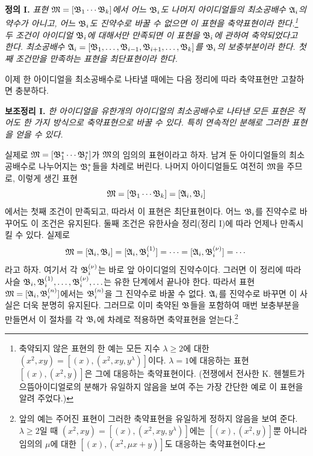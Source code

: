 \textbf{정의 I.} \emph{표현 $\mathfrak{M}=[\mathfrak{B}_1\cdots\mathfrak{B}_k]$에서 어느 $\mathfrak{B}_i$도 나머지 아이디얼들의 최소공배수 $\mathfrak{A}_i$의 약수가 아니고, 어느 $\mathfrak{B}_i$도 진약수로 바꿀 수 없으면 이 표현을 축약표현이라 한다.\footnote{축약되지 않은 표현의 한 예는 모든 지수 $\lambda\ge2$에 대한 $(x^2,xy)=[(x),(x^2,xy,y^\lambda)]$이다. $\lambda=1$에 대응하는 표현 $[(x),(x^2,y)]$은 그에 대응하는 축약표현이다. (전쟁에서 전사한 K. 헨첼트가 으뜸아이디얼로의 분해가 유일하지 않음을 보여 주는 가장 간단한 예로 이 표현을 알려 주었다.)} 두 조건이 아이디얼 $\mathfrak{B}_i$에 대해서만 만족되면 이 표현을 $\mathfrak{B}_i$에 관하여 축약되었다고 한다. 최소공배수 $\mathfrak{A}_i=[\mathfrak{B}_1,\ldots,\mathfrak{B}_{i-1},\mathfrak{B}_{i+1},\ldots,\mathfrak{B}_k]$를 $\mathfrak{B}_i$의 보충부분이라 한다. 첫째 조건만을 만족하는 표현을 최단표현이라 한다.}

이제 한 아이디얼을 최소공배수로 나타낼 때에는 다음 정리에 따라 축약표현만 고찰하면 충분하다.

\textbf{보조정리 I.} \emph{한 아이디얼을 유한개의 아이디얼의 최소공배수로 나타낸 모든 표현은 적어도 한 가지 방식으로 축약표현으로 바꿀 수 있다. 특히 연속적인 분해로 그러한 표현을 얻을 수 있다.}

실제로 $\mathfrak{M}=[\mathfrak{B}_1^*\cdots\mathfrak{B}_l^*]$가 $\mathfrak{M}$의 임의의 표현이라고 하자. 남겨 둔 아이디얼들의 최소공배수로 나누어지는 $\mathfrak{B}_i^*$들을 차례로 버린다. 나머지 아이디얼들도 여전히 $\mathfrak{M}$을 주므로, 이렇게 생긴 표현
\[
 \mathfrak{M}=[\mathfrak{B}_1\cdots\mathfrak{B}_k]=[\mathfrak{A}_i,\mathfrak{B}_i]
\]
에서는 첫째 조건이 만족되고, 따라서 이 표현은 최단표현이다. 어느 $\mathfrak{B}_i$를 진약수로 바꾸어도 이 조건은 유지된다. 둘째 조건은 유한사슬 정리(정리 I)에 따라 언제나 만족시킬 수 있다. 실제로
\[
 \mathfrak{M}=[\mathfrak{A}_i,\mathfrak{B}_i]=[\mathfrak{A}_i,\mathfrak{B}_i^{(1)}]
 =\cdots=[\mathfrak{A}_i,\mathfrak{B}_i^{(\nu)}]=\cdots
\]
라고 하자. 여기서 각 $\mathfrak{B}_i^{(\nu)}$는 바로 앞 아이디얼의 진약수이다. 그러면 이 정리에 따라 사슬 $\mathfrak{B}_i,\mathfrak{B}_i^{(1)},\ldots,\mathfrak{B}_i^{(\nu)},\ldots$는 유한 단계에서 끝나야 한다. 따라서 표현 $\mathfrak{M}=[\mathfrak{A}_i,\mathfrak{B}_i^{(n)}]$에서는 $\mathfrak{B}_i^{(n)}$을 그 진약수로 바꿀 수 없다. $\mathfrak{A}_i$를 진약수로 바꾸면 이 사실은 더욱 분명히 유지된다. 그러므로 이미 축약된 $\mathfrak{B}$들을 포함하여 매번 보충부분을 만들면서 이 절차를 각 $\mathfrak{B}_i$에 차례로 적용하면 축약표현을 얻는다.\footnote{앞의 예는 주어진 표현이 그러한 축약표현을 유일하게 정하지 않음을 보여 준다. $\lambda\ge2$일 때 $(x^2,xy)=[(x),(x^2,xy,y^\lambda)]$에는 $[(x),(x^2,y)]$뿐 아니라 임의의 $\mu$에 대한 $[(x),(x^2,\mu x+y)]$도 대응하는 축약표현이다.}

